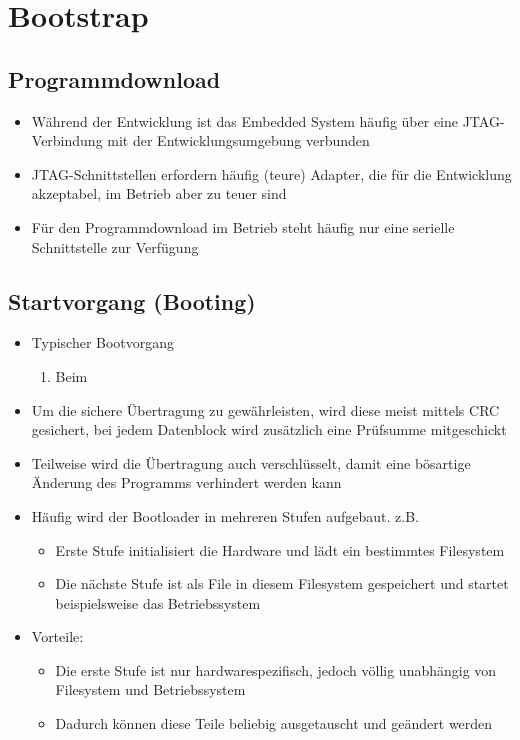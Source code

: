 \section{Bootstrap}
\subsection{Programmdownload }
\begin{itemize}
	\item Während der Entwicklung ist das Embedded System häufig über eine JTAG-Verbindung mit der Entwicklungsumgebung verbunden 
	\item JTAG-Schnittstellen erfordern häufig (teure) Adapter, die für die Entwicklung akzeptabel, im Betrieb aber zu teuer sind
	\item Für den Programmdownload im Betrieb steht häufig nur eine serielle Schnittstelle zur Verfügung
\end{itemize}
\subsection{Startvorgang (Booting) }
\begin{itemize}
	\item Typischer Bootvorgang
	\begin{enumerate}
		\item Beim 
	\end{enumerate}
	\item Um die sichere Übertragung zu gewährleisten, wird diese meist mittels CRC gesichert, bei jedem Datenblock wird zusätzlich eine Prüfsumme mitgeschickt
	\item Teilweise wird die Übertragung auch verschlüsselt, damit eine bösartige Änderung des Programms verhindert werden kann
	\item Häufig wird der Bootloader in mehreren Stufen aufgebaut. z.B.
	\begin{itemize}
		\item Erste Stufe initialisiert die Hardware und lädt ein bestimmtes Filesystem
		\item Die nächste Stufe ist als File in diesem Filesystem gespeichert und startet beispielsweise das Betriebssystem
	\end{itemize}
	\item Vorteile:
	\begin{itemize}
		\item Die erste Stufe ist nur hardwarespezifisch, jedoch völlig unabhängig von Filesystem und Betriebssystem
		\item Dadurch können diese Teile beliebig ausgetauscht und geändert werden
	\end{itemize}
\end{itemize}

